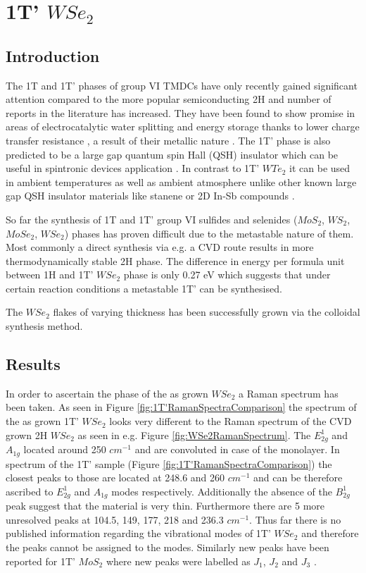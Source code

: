 \chapter{1T' $WSe_2$}

\section{Introduction}

The 1T and 1T' phases of group VI TMDCs have only recently gained significant attention compared to the more popular semiconducting 2H and number of reports in the literature has increased. They have been found to show promise in areas of electrocatalytic water splitting and energy storage thanks to lower charge transfer resistance \cite{Voiry2013}, a result of their metallic nature \cite{Wypych1992}. The 1T' phase is also predicted to be a large gap quantum spin Hall (QSH) insulator which can be useful in spintronic devices  application \cite{Chen2018}. In contrast to 1T' $WTe_2$ \cite{Fei2017} it can be used in ambient temperatures as well as ambient atmosphere unlike other known large gap QSH insulator materials like stanene \cite{Xu2013} or 2D In-Sb compounds \cite{Gruznev2018}. 

So far the synthesis of 1T and 1T' group VI sulfides and selenides ($MoS_2$, $WS_2$, $MoSe_2$, $WSe_2$)  phases has proven difficult due to the metastable nature of them. Most commonly a direct synthesis via e.g. a CVD route results in more thermodynamically stable 2H phase. The difference in energy per formula unit between 1H and 1T' $WSe_2$ phase is only 0.27 eV which suggests that under certain reaction conditions a metastable 1T' can be synthesised.

The $WSe_2$ flakes of varying thickness has been successfully grown via the colloidal synthesis method.

\section{Results}

In order to ascertain the phase of the as grown $WSe_2$ a Raman spectrum has been taken. As seen in Figure \ref{fig:1T'RamanSpectraComparison} the spectrum of the as grown 1T' $WSe_2$ looks very different to the Raman spectrum of the CVD grown 2H $WSe_2$ as seen in e.g. Figure \ref{fig:WSe2RamanSpectrum}. The $E^1_{2g}$ and $A_{1g}$ located around 250 $cm^{-1}$ and are convoluted in case of the monolayer. In spectrum of the 1T' sample (Figure \ref{fig:1T'RamanSpectraComparison}) the closest peaks to those are located at 248.6 and 260 $cm^{-1}$ and can be therefore ascribed to $E^1_{2g}$ and $A_{1g}$ modes respectively. Additionally the absence of the $B^1_{2g}$ peak suggest that the material is very thin. Furthermore there are 5 more unresolved peaks at 104.5, 149, 177, 218 and 236.3 $cm^{-1}$. Thus far there is no published information regarding the vibrational modes of 1T' $WSe_2$ and therefore the peaks cannot be assigned to the modes. Similarly new peaks have been reported for 1T' $MoS_2$ where new peaks were labelled as $J_1$, $J_2$ and $J_3$ \cite{Yu2018}.

